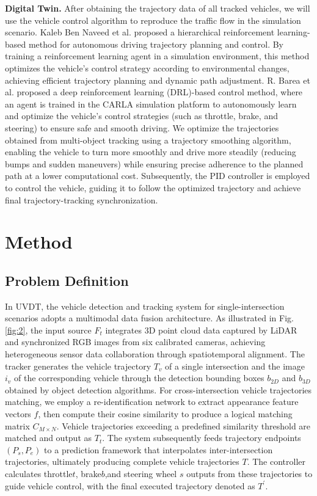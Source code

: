 \documentclass[lettersize,journal]{IEEEtran}
\begin{document}
\textbf{Digital Twin.}
After obtaining the trajectory data of all tracked vehicles, we will use the vehicle control algorithm to reproduce the traffic flow in the simulation scenario.
Kaleb Ben Naveed et al. proposed a hierarchical reinforcement learning-based method for autonomous driving trajectory planning and control. 
By training a reinforcement learning agent in a simulation environment, this method optimizes the vehicle's control strategy according to environmental changes, achieving efficient trajectory planning and dynamic path adjustment.\cite{Alpher22}
R. Barea et al. proposed a deep reinforcement learning (DRL)-based control method, where an agent is trained in the CARLA simulation platform to autonomously learn and optimize the vehicle's control strategies (such as throttle, brake, and steering) to ensure safe and smooth driving.\cite{Alpher21}
We optimize the trajectories obtained from multi-object tracking using a trajectory smoothing algorithm, enabling the vehicle to turn more smoothly and drive more steadily (reducing bumps and sudden maneuvers) while ensuring precise adherence to the planned path at a lower computational cost. 
Subsequently, the PID controller is employed to control the vehicle, guiding it to follow the optimized trajectory and achieve final trajectory-tracking synchronization.


\section{Method}

\subsection{Problem Definition}

In UVDT, the vehicle detection and tracking system for single-intersection scenarios adopts a multimodal data fusion architecture.
As illustrated in Fig. \ref{fig:2}, the input source \(F_{t}\) integrates 3D point cloud data captured by LiDAR and synchronized RGB images from six calibrated cameras, achieving heterogeneous sensor data collaboration through spatiotemporal alignment.
The tracker generates the vehicle trajectory \(T_{v}\) of a single intersection and the image \(i_{v}\) of the corresponding vehicle through the detection bounding boxes \(b_{2D}\) and \(b_{3D}\) obtained by object detection algorithms.
For cross-intersection vehicle trajectories matching, we employ a re-identification network to extract appearance feature vectors \(f\), then compute their cosine similarity to produce a logical matching matrix \(C_{M \times N}\).
Vehicle trajectories exceeding a predefined similarity threshold are matched and output as \(T_{t}\).
The system subsequently feeds trajectory endpoints \((P_{s},P_{e})\) to a prediction framework that interpolates inter-intersection trajectories, ultimately producing complete vehicle trajectories \(T\). 
The controller calculates throttle\(t\), brake\(b\),and steering wheel \(s\) outputs from these trajectories to guide vehicle control, with the final executed trajectory denoted as \(T^\prime\).
\end{document}
